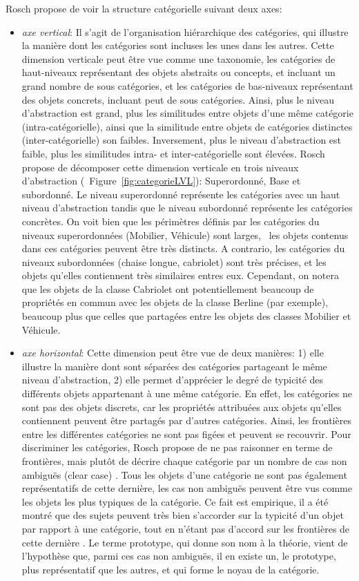 Rosch propose de voir la structure catégorielle suivant deux axes:

\begin{itemize}
\item \textit{axe vertical}: Il s'agit de l'organisation hiérarchique des catégories, qui illustre la manière dont les catégories sont incluses les unes dans les autres. Cette dimension verticale peut être vue comme une taxonomie, les catégories de haut-niveaux représentant des objets abstraits ou concepts, et incluant un grand nombre de sous catégories, et les catégories de bas-niveaux représentant des objets concrets, incluant peut de sous catégories. Ainsi, plus le niveau d'abstraction est grand, plus les similitudes entre objets d'une même catégorie (intra-catégorielle), ainsi que la similitude entre objets de catégories distinctes (inter-catégorielle) son faibles. Inversement, plus le niveau d'abstraction est faible, plus les similitudes intra- et inter-catégorielle sont élevées. Rosch propose de décomposer cette dimension verticale en trois niveaux d'abstraction (\Cf~Figure~\ref{fig:categorieLVL}): Superordonné, Base et subordonné. Le niveau superordonné représente les catégories avec un haut niveau d'abstraction tandis que le niveau subordonné représente les catégories concrètes. On voit bien que les périmètres définis par les catégories du niveaux superordonnées (Mobilier, Véhicule) sont larges, \ie~les objets contenus dans ces catégories peuvent être très distincts. A contrario, les catégories du niveaux subordonnées (chaise longue, cabriolet) sont très précises, et les objets qu'elles contiennent très similaires entres eux. Cependant, on notera que les objets de la classe Cabriolet ont potentiellement beaucoup de propriétés en commun avec les objets de la classe Berline (par exemple), beaucoup plus que celles que partagées entre les objets des classes Mobilier et Véhicule. 
\item \textit{axe horizontal}: Cette dimension peut être vue de deux manières: 1) elle illustre la manière dont sont séparées des catégories partageant le même niveau d'abstraction, 2) elle permet d'apprécier le degré de typicité des différents objets appartenant à une même catégorie. En effet, les catégories ne sont pas des objets discrets, car les propriétés attribuées aux objets qu'elles contiennent peuvent être partagés par d'autres catégories. Ainsi, les frontières entre les différentes catégories ne sont pas figées et peuvent se recouvrir. Pour discriminer les catégories, Rosch propose de ne pas raisonner en terme de frontières, mais plutôt de décrire chaque catégorie par un nombre de cas non ambiguës (clear case) \citep[p. 36]{rosch1978cognition}. Tous les objets d'une catégorie ne sont pas également représentatifs de cette dernière, les cas non ambiguës peuvent être vus comme les objets les plus typiques de la catégorie. Ce fait est empirique, il a été montré que des sujets peuvent très bien s'accorder sur la typicité d'un objet par rapport à une catégorie, tout en n'étant pas d'accord sur les frontières de cette dernière \citep{rosch1974human,rosch1975cognitive}. Le terme prototype, qui donne son nom à la théorie, vient de l'hypothèse que, parmi ces cas non ambiguës, il en existe un, le prototype, plus représentatif que les autres, et qui forme le noyau de la catégorie.

\end{itemize}
